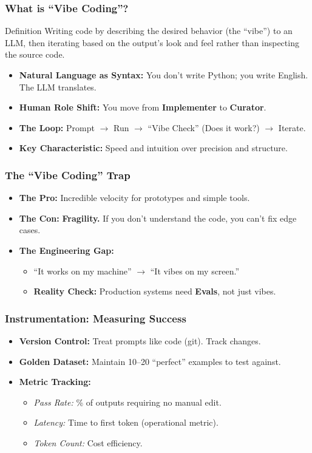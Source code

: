 \documentclass{beamer}
\begin{document}
\begin{frame}
    \frametitle{What is ``Vibe Coding''?}
    \begin{block}{Definition}
        Writing code by describing the desired behavior (the ``vibe'') to an LLM, then iterating based on the output's look and feel rather than inspecting the source code.
    \end{block}
    \begin{itemize}
        \item \textbf{Natural Language as Syntax:} You don't write Python; you write English. The LLM translates.
        \item \textbf{Human Role Shift:} You move from \textbf{Implementer} to \textbf{Curator}.
        \item \textbf{The Loop:} Prompt $\to$ Run $\to$ ``Vibe Check'' (Does it work?) $\to$ Iterate.
        \item \textbf{Key Characteristic:} Speed and intuition over precision and structure.
    \end{itemize}
\end{frame}

\begin{frame}
    \frametitle{The ``Vibe Coding'' Trap}
    \begin{itemize}
        \item \textbf{The Pro:} Incredible velocity for prototypes and simple tools.
        \item \textbf{The Con:} \textbf{Fragility.} If you don't understand the code, you can't fix edge cases.
        \item \textbf{The Engineering Gap:}
        \begin{itemize}
            \item ``It works on my machine'' $\to$ ``It vibes on my screen.''
            \item \textbf{Reality Check:} Production systems need \textbf{Evals}, not just vibes.
        \end{itemize}
    \end{itemize}
\end{frame}

\begin{frame}
    \frametitle{Instrumentation: Measuring Success}
    \begin{itemize}
        \item \textbf{Version Control:} Treat prompts like code (git). Track changes.
        \item \textbf{Golden Dataset:} Maintain 10--20 ``perfect'' examples to test against.
        \item \textbf{Metric Tracking:}
        \begin{itemize}
            \item \textit{Pass Rate:} \% of outputs requiring no manual edit.
            \item \textit{Latency:} Time to first token (operational metric).
            \item \textit{Token Count:} Cost efficiency.
        \end{itemize}
    \end{itemize}
\end{frame}
\end{document}
